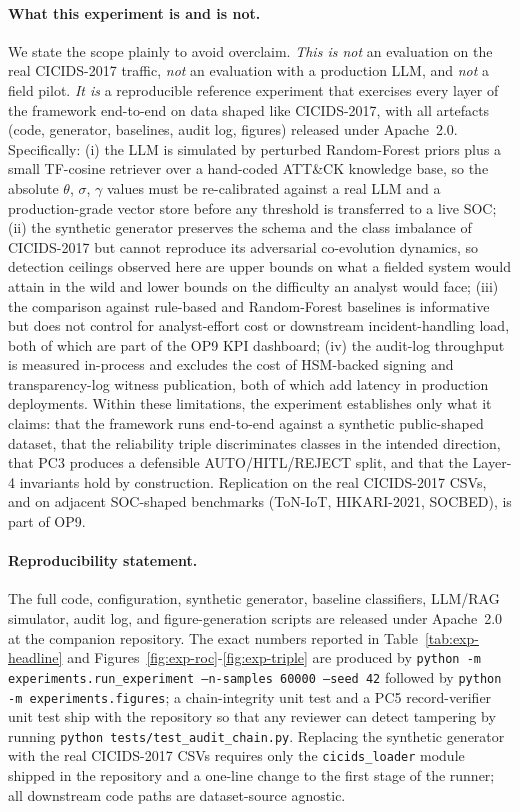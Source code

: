 \documentclass[preprint,12pt,authoryear]{elsarticle}
\begin{document}
\paragraph{What this experiment is and is not.}
We state the scope plainly to avoid overclaim.  \emph{This is not} an evaluation on the real CICIDS-2017 traffic, \emph{not} an evaluation with a production LLM, and \emph{not} a field pilot.  \emph{It is} a reproducible reference experiment that exercises every layer of the framework end-to-end on data shaped like CICIDS-2017, with all artefacts (code, generator, baselines, audit log, figures) released under Apache~2.0.  Specifically: (i) the LLM is simulated by perturbed Random-Forest priors plus a small TF-cosine retriever over a hand-coded ATT\&CK knowledge base, so the absolute $\theta$, $\sigma$, $\gamma$ values must be re-calibrated against a real LLM and a production-grade vector store before any threshold is transferred to a live SOC; (ii) the synthetic generator preserves the schema and the class imbalance of CICIDS-2017 \citep{sharafaldin2018cicids} but cannot reproduce its adversarial co-evolution dynamics, so detection ceilings observed here are upper bounds on what a fielded system would attain in the wild and lower bounds on the difficulty an analyst would face; (iii) the comparison against rule-based and Random-Forest baselines is informative but does not control for analyst-effort cost or downstream incident-handling load, both of which are part of the OP9 KPI dashboard; (iv) the audit-log throughput is measured in-process and excludes the cost of HSM-backed signing and transparency-log witness publication, both of which add latency in production deployments.  Within these limitations, the experiment establishes only what it claims: that the framework runs end-to-end against a synthetic public-shaped dataset, that the reliability triple discriminates classes in the intended direction, that PC3 produces a defensible AUTO/HITL/REJECT split, and that the Layer-4 invariants hold by construction.  Replication on the real CICIDS-2017 CSVs, and on adjacent SOC-shaped benchmarks (ToN-IoT, HIKARI-2021, SOCBED), is part of OP9.

\paragraph{Reproducibility statement.}
The full code, configuration, synthetic generator, baseline classifiers, LLM/RAG simulator, audit log, and figure-generation scripts are released under Apache~2.0 at the companion repository.  The exact numbers reported in Table~\ref{tab:exp-headline} and Figures~\ref{fig:exp-roc}-\ref{fig:exp-triple} are produced by \texttt{python -m experiments.run\_experiment --n-samples 60000 --seed 42} followed by \texttt{python -m experiments.figures}; a chain-integrity unit test and a PC5 record-verifier unit test ship with the repository so that any reviewer can detect tampering by running \texttt{python tests/test\_audit\_chain.py}.  Replacing the synthetic generator with the real CICIDS-2017 CSVs requires only the \texttt{cicids\_loader} module shipped in the repository and a one-line change to the first stage of the runner; all downstream code paths are dataset-source agnostic.
\end{document}
